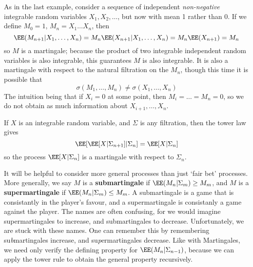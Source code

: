 \begin{example}
    As in the last example, consider a sequence of independent {\it non-negative} integrable random variables $X_1, X_2, \dots$, but now with mean 1 rather than 0. If we define $M_0 = 1$, $M_n = X_1 \dots X_n$, then
    \[ \EE(M_{n+1}|X_1, \dots, X_n) = M_n \EE(X_{n+1}|X_1, \dots, X_n) = M_n \EE(X_{n+1}) = M_n \]
    so $M$ is a martingale; because the product of two integrable independent random variables is also integrable, this guarantees $M$ is also integrable. It is also a martingale with respect to the natural filtration on the $M_n$, though this time it is possible that
    \[ \sigma(M_1, \dots, M_n) \neq \sigma(X_1, \dots, X_n) \]
    The intuition being that if $X_i = 0$ at some point, then $M_i = \dots = M_n = 0$, so we do not obtain as much information about $X_{i+1}, \dots, X_n$.
\end{example}

\begin{example}
    If $X$ is an integrable random variable, and $\Sigma$ is any filtration, then the tower law gives
    \[ \EE[\EE[X|\Sigma_{n+1}]|\Sigma_n] = \EE[X|\Sigma_n] \]
    so the process $\EE[X|\Sigma_n]$ is a martingale with respect to $\Sigma_n$.
\end{example}

It will be helpful to consider more general processes than just `fair bet' processes. More generally, we say $M$ is a {\bf submartingale} if $\EE(M_n|\Sigma_m) \geq M_m$, and $M$ is a {\bf supermartingale} if $\EE(M_n|\Sigma_m) \leq M_m$. A submartingale is a game that is consistantly in the player's favour, and a supermartingale is consistanly a game against the player. The names are often confusing, for we would imagine supermartingales to increase, and submartingales to decrease. Unfortunately, we are stuck with these names. One can remember this by remembering su{\it b}martingales increase, and su{\it p}ermartingales decrease. Like with Martingales, we need only verify the defining property for $\EE(M_n|\Sigma_{n-1})$, because we can apply the tower rule to obtain the general property recursively.

